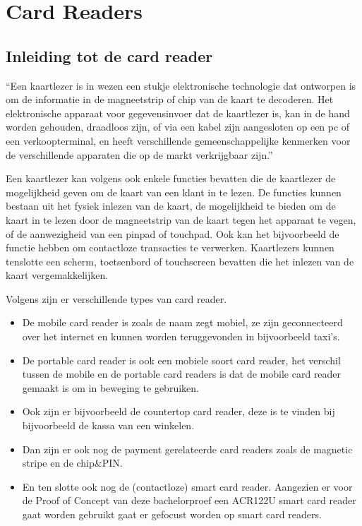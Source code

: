 \section{Card Readers}
\subsection{Inleiding tot de card reader}
``Een kaartlezer is in wezen een stukje elektronische technologie dat ontworpen is om de informatie in de magneetstrip of chip van de kaart te decoderen. Het elektronische apparaat voor gegevensinvoer dat de kaartlezer is, kan in de hand worden gehouden, draadloos zijn, of via een kabel zijn aangesloten op een pc of een verkoopterminal, en heeft verschillende gemeenschappelijke kenmerken voor de verschillende apparaten die op de markt verkrijgbaar zijn.''\autocite{MarinPenchevCardReader}

Een kaartlezer kan volgens \textcite{MarinPenchevCardReader} ook enkele functies bevatten die de kaartlezer de mogelijkheid geven om de kaart van een klant in te lezen. De functies kunnen bestaan uit het fysiek inlezen van de kaart, de mogelijkheid te bieden om de kaart in te lezen door de magneetstrip van de kaart tegen het apparaat te vegen, of de aanwezigheid van een pinpad of touchpad. Ook kan het bijvoorbeeld de functie hebben om contactloze transacties te verwerken. Kaartlezers kunnen tenslotte een scherm, toetsenbord of touchscreen bevatten die het inlezen van de kaart vergemakkelijken.

Volgens \textcite{MarinPenchevCardReader} zijn er verschillende types van card reader. 
\begin{itemize}
    \item De mobile card reader is zoals de naam zegt mobiel, ze zijn geconnecteerd over het internet en kunnen worden teruggevonden in bijvoorbeeld taxi's.
    \item De portable card reader is ook een mobiele soort card reader, het verschil tussen de mobile en de portable card readers is dat de mobile card reader gemaakt is om in beweging te gebruiken.
    \item Ook zijn er bijvoorbeeld de countertop card reader, deze is te vinden bij bijvoorbeeld de kassa van een winkelen.
    \item Dan zijn er ook nog de payment gerelateerde card readers zoals de magnetic stripe en de chip\&PIN.
    \item En ten slotte ook nog de (contactloze) smart card reader. Aangezien er voor de Proof of Concept van deze bachelorproef een ACR122U smart card reader gaat worden gebruikt gaat er gefocust worden op smart card readers.
\end{itemize}





